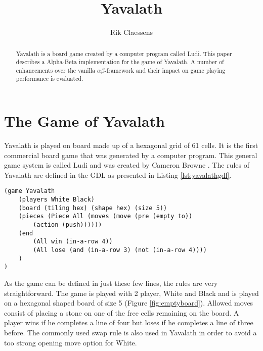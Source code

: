 \documentclass[11pt]{article}
\begin{document}
\title{{\Huge Yavalath} \\ \vspace{0.5em}{\large August 2014 - Intelligent Search \& Games\\ Master Artificial Intelligence, Maastricht University}}	
\author{Rik Claessens}

\maketitle

\begin{abstract}
Yavalath is a board game created by a computer program called Ludi. This paper describes a Alpha-Beta implementation for the game of Yavalath. A number of enhancements over the vanilla $\alpha \beta$-framework and their impact on game playing performance is evaluated.
\end{abstract}

\section{The Game of Yavalath}
\label{-sec:thegameofyavalath}
Yavalath is played on board made up of a hexagonal grid of 61 cells. It is the first commercial board game that was generated by a computer program. This general game system is called Ludi and was created by Cameron Browne \cite{browne2011evolutionary}. The rules of Yavalath are defined in the \ac{GDL} as presented in Listing \ref{lst:yavalathgdl}. 

\listingspace
\begin{lstlisting}[caption={The Yavalath definition in GDL}]
(game Yavalath
	(players White Black)
	(board (tiling hex) (shape hex) (size 5))
	(pieces (Piece All (moves (move (pre (empty to))
		(action (push)))))) 
	(end
		(All win (in-a-row 4))
		(All lose (and (in-a-row 3) (not (in-a-row 4))))
	)
)
\end{lstlisting}
\label{lst:yavalathgdl}
\listingspace

As the game can be defined in just these few lines, the rules are very straightforward. The game is played with 2 player, White and Black and is played on a hexagonal shaped board of size 5 (Figure \ref{fig:emptyboard}). Allowed moves consist of placing a stone on one of the free cells remaining on the board. A player wins if he completes a line of four but loses if he completes a line of three before. The commonly used swap rule is also used in Yavalath in order to avoid a too strong opening move option for White. 
\end{document}
